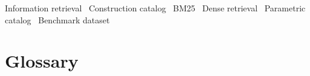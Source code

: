 \documentclass[preprint,12pt]{elsarticle}
\begin{document}
\begin{frontmatter}
\begin{abstract}
\end{abstract}

\begin{keyword}
Information retrieval \ Construction catalog \ BM25 \ Dense retrieval \ Parametric catalog \ Benchmark dataset
\end{keyword}

\end{frontmatter}

\section*{Glossary}
\end{document}

